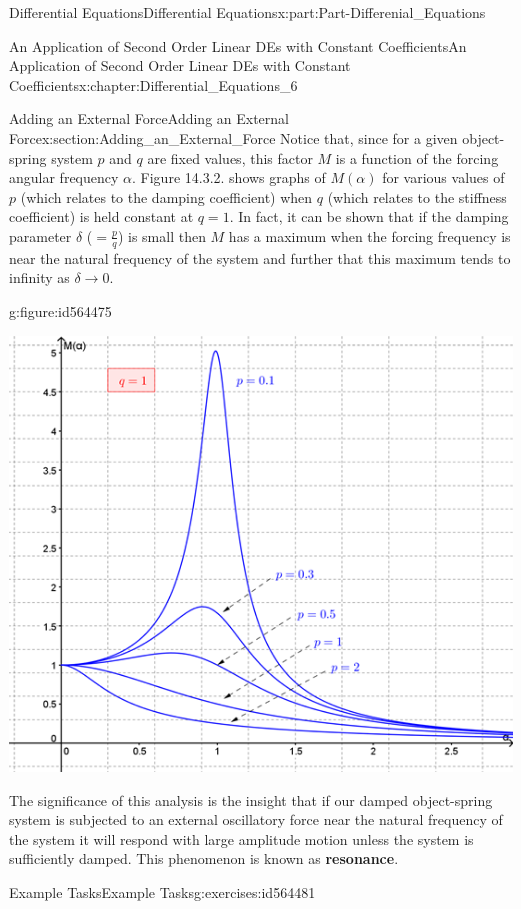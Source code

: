 \documentclass[oneside,10pt,]{book}
\newcommand{\terminology}[1]{\textbf{#1}}
\numberwithin{equation}{section}
\begin{document}
\begin{partptx}{Differential Equations}{}{Differential Equations}{}{}{x:part:Part-Differenial_Equations}
\begin{chapterptx}{An Application of Second Order Linear DEs with Constant Coefficients}{}{An Application of Second Order Linear DEs with Constant Coefficients}{}{}{x:chapter:Differential_Equations_6}
\begin{sectionptx}{Adding an External Force}{}{Adding an External Force}{}{}{x:section:Adding_an_External_Force}
Notice that, since for a given object-spring system \(p\) and \(q\) are fixed values, this factor \(M\) is a function of the forcing angular frequency \(\alpha\). Figure 14.3.2. shows graphs of \(M(\alpha)\) for various values of \(p\) (which relates to the damping coefficient) when \(q\) (which relates to the stiffness coefficient) is held constant at \(q=1\). In fact, it can be shown that if the damping parameter \(\delta\) (\(=\frac{p}{q}\)) is small then \(M\) has a maximum when the forcing frequency is near the natural frequency of the system and further that this maximum tends to infinity as \(\delta\rightarrow 0\). \begin{figureptx}{}{g:figure:id564475}{}%
\begin{image}{0.2}{0.6}{0.2}%
\includegraphics[width=\linewidth]{./DifferentialEquations/Images/6/figure_9.png}
\end{image}%
\tcblower
\end{figureptx}%
%
\par
The significance of this analysis is the insight that if our damped object-spring system is subjected to an external oscillatory force near the natural frequency of the system it will respond with large amplitude motion unless the system is sufficiently damped. This phenomenon is known as \terminology{resonance}.%
%
%
\typeout{************************************************}
\typeout{************************************************}
%
\begin{exercises-subsection-numberless}{Example Tasks}{}{Example Tasks}{}{}{g:exercises:id564481}

\end{exercises-subsection-numberless}
\end{sectionptx}
\end{chapterptx}
\end{partptx}
\end{document}
